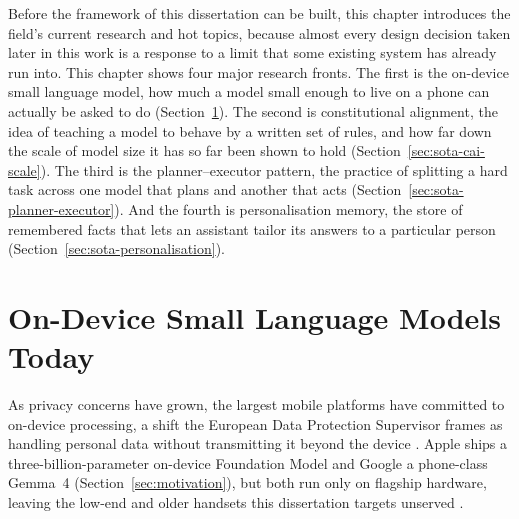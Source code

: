 Before the framework of this dissertation can be built, this chapter introduces the field's current research and hot topics, because almost every design decision taken later in this work is a response to a limit that some existing system has already run into. This chapter shows four major research fronts. The first is the on-device small language model, how much a model small enough to live on a phone can actually be asked to do (Section~\ref{sec:sota-on-device}). The second is constitutional alignment, the idea of teaching a model to behave by a written set of rules, and how far down the scale of model size it has so far been shown to hold (Section~\ref{sec:sota-cai-scale}). The third is the planner--executor pattern, the practice of splitting a hard task across one model that plans and another that acts (Section~\ref{sec:sota-planner-executor}). And the fourth is personalisation memory, the store of remembered facts that lets an assistant tailor its answers to a particular person (Section~\ref{sec:sota-personalisation}). 

\section{On-Device Small Language Models Today}
\label{sec:sota-on-device}

As privacy concerns have grown, the largest mobile platforms have committed to on-device processing, a shift the European Data Protection Supervisor frames as handling personal data without transmitting it beyond the device \cite{edps2025ondeviceai}. Apple ships a three-billion-parameter on-device Foundation Model and Google a phone-class Gemma~4 (Section~\ref{sec:motivation}), but both run only on flagship hardware, leaving the low-end and older handsets this dissertation targets unserved \cite{tummalapalli2026llminferenceedgemobile}.

